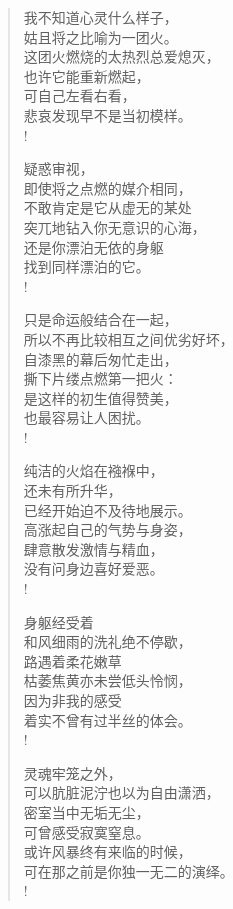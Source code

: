 \documentclass[UTF8, 12pt, a4paper]{ctexrep} %
\begin{document}
\begin{verse}

    我不知道心灵什么样子，\\
    姑且将之比喻为一团火。\\
    这团火燃烧的太热烈总爱熄灭，\\
    也许它能重新燃起，\\
    可自己左看右看，\\
    悲哀发现早不是当初模样。\\!
    
    疑惑审视，\\
    即使将之点燃的媒介相同，\\
    不敢肯定是它从虚无的某处\\
    突兀地钻入你无意识的心海，\\
    还是你漂泊无依的身躯\\
    找到同样漂泊的它。\\!
    
    只是命运般结合在一起，\\
    所以不再比较相互之间优劣好坏，\\
    自漆黑的幕后匆忙走出，\\
    撕下片缕点燃第一把火：\\
    是这样的初生值得赞美，\\
    也最容易让人困扰。\\!
    
    纯洁的火焰在襁褓中，\\
    还未有所升华，\\
    已经开始迫不及待地展示。\\
    高涨起自己的气势与身姿，\\
    肆意散发激情与精血，\\
    没有问身边喜好爱恶。\\!
    
    身躯经受着\\
    和风细雨的洗礼绝不停歇，\\
    路遇着柔花嫩草\\
    枯萎焦黄亦未尝低头怜悯，\\
    因为非我的感受\\
    着实不曾有过半丝的体会。\\!
    
    灵魂牢笼之外，\\
    可以肮脏泥泞也以为自由潇洒，\\
    密室当中无垢无尘，\\
    可曾感受寂寞窒息。\\
    或许风暴终有来临的时候，\\
    可在那之前是你独一无二的演绎。\\!
    

\end{verse}
\end{document}
